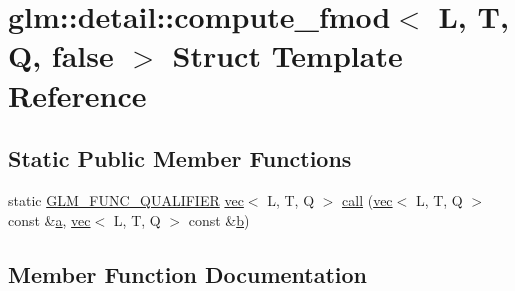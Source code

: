\hypertarget{structglm_1_1detail_1_1compute__fmod_3_01_l_00_01_t_00_01_q_00_01false_01_4}{}\section{glm\+:\+:detail\+:\+:compute\+\_\+fmod$<$ L, T, Q, false $>$ Struct Template Reference}
\label{structglm_1_1detail_1_1compute__fmod_3_01_l_00_01_t_00_01_q_00_01false_01_4}
\subsection*{Static Public Member Functions}
\begin{DoxyCompactItemize}
\item 
static \mbox{\hyperlink{setup_8hpp_a33fdea6f91c5f834105f7415e2a64407}{G\+L\+M\+\_\+\+F\+U\+N\+C\+\_\+\+Q\+U\+A\+L\+I\+F\+I\+ER}} \mbox{\hyperlink{structglm_1_1vec}{vec}}$<$ L, T, Q $>$ \mbox{\hyperlink{structglm_1_1detail_1_1compute__fmod_3_01_l_00_01_t_00_01_q_00_01false_01_4_acaf9308834aca953f992553e0ff0a0e0}{call}} (\mbox{\hyperlink{structglm_1_1vec}{vec}}$<$ L, T, Q $>$ const \&\mbox{\hyperlink{_s_d_l__opengl__glext_8h_a3309789fc188587d666cda5ece79cf82}{a}}, \mbox{\hyperlink{structglm_1_1vec}{vec}}$<$ L, T, Q $>$ const \&\mbox{\hyperlink{_s_d_l__opengl__glext_8h_a0f71581a41fd2264c8944126dabbd010}{b}})
\end{DoxyCompactItemize}


\subsection{Member Function Documentation}
\mbox{\label{structglm_1_1detail_1_1compute__fmod_3_01_l_00_01_t_00_01_q_00_01false_01_4_acaf9308834aca953f992553e0ff0a0e0}} 
